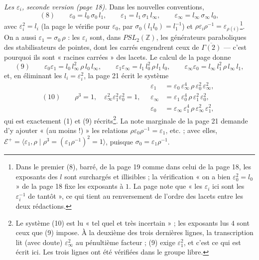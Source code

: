 \documentclass[11pt,a4paper]{article}
\begin{document}
\emph{Les $\varepsilon_i$, seconde version (page 18).} Dans les nouvelles
conventions,
\[
(8)\qquad \varepsilon_0 = l_0\,\sigma_0\, l_1, \qquad
\varepsilon_1 = l_1\,\sigma_1\, l_\infty, \qquad
\varepsilon_\infty = l_\infty\,\sigma_\infty\, l_0,
\]
avec $\varepsilon_i^2 = l_i$ (la page le vérifie pour $\varepsilon_0$, par
$\sigma_0(l_1 l_0) = l_1^{-1}$) et $\rho\varepsilon_i\rho^{-1} =
\varepsilon_{\rho(i)}$\footnote{Dans le premier (8), barré, de la page 19 comme
dans celui de la page 18, les exposants des $l$ sont surchargés et illisibles ;
la vérification « on a bien $\varepsilon_0^2 = l_0$ » de la page 18 fixe les
exposants à $1$. La page note que « les $\varepsilon_i$ ici sont les
$\varepsilon_i^{-1}$ de tantôt », ce qui tient au renversement de l'ordre des
lacets entre les deux rédactions.}. On a aussi $\varepsilon_1 =
\sigma_0\,\rho$ : les $\varepsilon_i$ sont, dans $PSL_2(\mathbb{Z})$, les
générateurs paraboliques des stabilisateurs de pointes, dont les carrés
engendrent ceux de $\overline{\Gamma(2)}$ — c'est pourquoi ils sont « racines
carrées » des lacets. Le calcul de la page donne
\[
(9)\qquad
\varepsilon_0\varepsilon_1 = l_0\, l_\infty^2\, \rho\, l_0\, l_\infty, \qquad
\varepsilon_1\varepsilon_\infty = l_1\, l_0^2\, \rho\, l_1\, l_0, \qquad
\varepsilon_\infty\varepsilon_0 = l_\infty\, l_1^2\, \rho\, l_\infty\, l_1,
\]
et, en éliminant les $l_i = \varepsilon_i^2$, la page 21 écrit le système
\[
(10)\qquad \rho^3 = 1, \quad
\varepsilon_\infty^2\varepsilon_1^2\varepsilon_0^2 = 1, \quad
\begin{aligned}
\varepsilon_1 &= \varepsilon_0\,\varepsilon_\infty^{4}\,\rho\,\varepsilon_0^{2}\,\varepsilon_\infty^{2},\\
\varepsilon_\infty &= \varepsilon_1\,\varepsilon_0^{4}\,\rho\,\varepsilon_1^{2}\,\varepsilon_0^{2},\\
\varepsilon_0 &= \varepsilon_\infty\,\varepsilon_1^{4}\,\rho\,\varepsilon_\infty^{2}\,\varepsilon_1^{2},
\end{aligned}
\]
qui est exactement (1) et (9) récrits\footnote{Le système (10) est lu « tel quel
et très incertain » ; les exposants lus $4$ sont ceux que (9) impose. À la
deuxième des trois dernières lignes, la transcription lit (avec doute)
$\varepsilon_\infty^2$ au pénultième facteur ; (9) exige $\varepsilon_1^2$, et
c'est ce qui est écrit ici. Les trois lignes ont été vérifiées dans le groupe
libre.}. La note marginale de la page 21 demande d'y ajouter « (au moins !) »
les relations $\rho\varepsilon_0\rho^{-1} = \varepsilon_1$, etc. ; avec elles,
$\mathcal{E}^{+} = \langle \varepsilon_1, \rho \mid \rho^3 =
(\varepsilon_1\rho^{-1})^2 = 1 \rangle$, puisque $\sigma_0 =
\varepsilon_1\rho^{-1}$.
\end{document}
